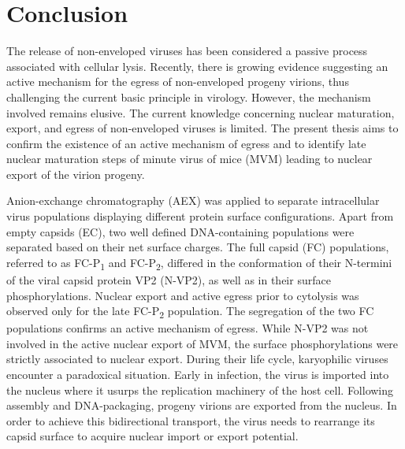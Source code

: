 
\chapter{Conclusion} %

\label{Conclusion} %


\graphicspath{{./Pictures/}}



The release of non-enveloped viruses has been considered a passive process associated with cellular lysis. Recently, there is growing evidence suggesting an active mechanism for the egress of non-enveloped progeny virions, thus challenging the current basic principle in virology. However, the mechanism involved remains elusive. The current knowledge concerning nuclear maturation, export, and egress of non-enveloped viruses is limited. The present thesis aims to confirm the existence of an active mechanism of egress and to identify late nuclear maturation steps of minute virus of mice (MVM) leading to nuclear export of the virion progeny. 
    
\par
\medskip
Anion-exchange chromatography (AEX) was applied to separate intracellular virus populations displaying different protein surface configurations. Apart from empty capsids (EC), two well defined DNA-containing populations were separated based on their net surface charges. The full capsid (FC) populations, referred to as FC-P\textsubscript{1} and FC-P\textsubscript{2}, differed in the conformation of their N-termini of the viral capsid protein VP2 (N-VP2), as well as in their surface phosphorylations. Nuclear export and active egress prior to cytolysis was observed only for the late FC-P\textsubscript{2} population. The segregation of the two FC populations confirms an active mechanism of egress. While N-VP2 was not involved in the active nuclear export of MVM, the surface phosphorylations were strictly associated to nuclear export. During their life cycle, karyophilic viruses encounter a paradoxical situation. Early in infection, the virus is imported into the nucleus where it usurps the replication machinery of the host cell. Following assembly and DNA-packaging, progeny virions are exported from the nucleus. In order to achieve this bidirectional transport, the virus needs to rearrange its capsid surface to acquire nuclear import or export potential. 



